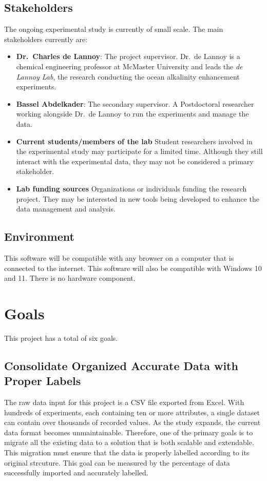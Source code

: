 \documentclass{article}
\begin{document}
\subsection{Stakeholders}
The ongoing experimental study is currently of small scale. \newline
The main stakeholders currently are:
\begin{itemize}
    \item \textbf{Dr.\ Charles de Lannoy}: The project supervisor.\newline
        Dr.\ de Lannoy is a chemical engineering professor at McMaster
        University and leads the \emph{de Lannoy Lab}, the research
        conducting the ocean alkalinity enhancement experiments.
    \item \textbf{Bassel Abdelkader}: The secondary supervisor.\newline
        A Postdoctoral researcher working alongside Dr.\ de Lannoy to run the
        experiments and manage the data.
    \item \textbf{Current students/members of the lab} \newline
        Student researchers involved in the experimental study may participate
        for a limited time. Although they still interact with the experimental
        data, they may not be considered a primary stakeholder.
    \item \textbf{Lab funding sources} \newline
        Organizations or individuals funding the research project. They may be
        interested in new tools being developed to enhance the data management
        and analysis.
\end{itemize}

\subsection{Environment}
This software will be compatible with any browser on a computer that is
connected to the internet. This software will also be compatible with Windows 10
and 11. There is no hardware component.


\section{Goals}
This project has a total of six goals.
\subsection{Consolidate Organized Accurate Data with Proper Labels}
The raw data input for this project is a CSV file exported from Excel. With
hundreds of experiments, each containing ten or more attributes, a single
dataset can contain over thousands of recorded values. As the study expands,
the current data format becomes unmaintainable. Therefore, one of the primary
goals is to migrate all the existing data to a solution that is both scalable
and extendable. This migration must ensure that the data is properly labelled
according to its original strcuture. This goal can be measured by the percentage
of data successfully imported and accurately labelled.
\end{document}

